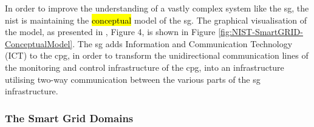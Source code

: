 In order to improve the understanding of a vastly complex system like the \acrlong{sg},
the \acrfull{nist} is maintaining the \hl{conceptual} model of the \acrlong{sg}. The graphical visualisation of the model, as presented in \cite[p. 13]{gopstein2021nist}, Figure 4,  is  shown in 
Figure \ref{fig:NIST-SmartGRID-ConceptualModel}.
The \acrlong{sg} adds Information and Communication Technology (ICT) to the \acrlong{cpg}, in order to transform the  unidirectional communication lines of the monitoring and control infrastructure of the \acrlong{cpg}, into an infrastructure utilising two-way communication between the various parts of the \acrlong{sg} infrastructure. 




\subsubsection{The Smart Grid Domains}

